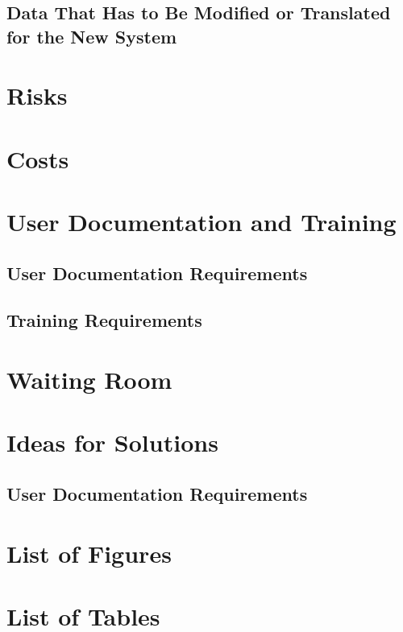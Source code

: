 \documentclass{article}
\begin{document}
\subsection{Data That Has to Be Modified or Translated for the New System}


\section{Risks}

\section{Costs}

\section{User Documentation and Training}

\subsection{User Documentation Requirements}


\subsection{Training Requirements}


\section{Waiting Room}


\section{Ideas for Solutions}

\subsection{User Documentation Requirements}


\section*{List of Figures}
\listoffigures

\section*{List of Tables}
\listoftables
\end{document}
